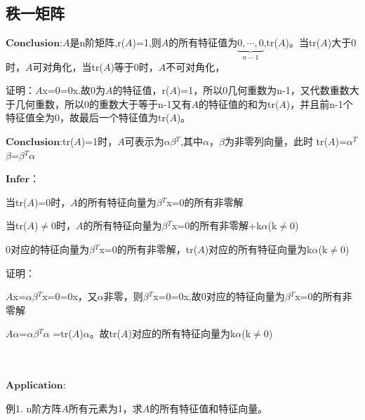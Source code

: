 \documentclass[lang=cn,10pt]{elegantbook}
\begin{document}
\subsection{秩一矩阵}

  $\mathbf{Conclusion}$:$\mathit{A}$是n阶矩阵,r($\mathit{A}$)=1,则$\mathit{A}$的所有特征值为$\underset{n-1}{\underbrace{0,\cdots ,0} } $,tr($\mathit{A}$)。当tr($\mathit{A}$)大于0时，$\mathit{A}$可对角化，当tr($\mathit{A}$)等于0时，$\mathit{A}$不可对角化，
  
  证明：$\mathit{A}$x=0=0x.故0为$\mathit{A}$的特征值，r($\mathit{A}$)=1，所以0几何重数为n-1，又代数重数大于几何重数，所以0的重数大于等于n-1又有$\mathit{A}$的特征值的和为tr($\mathit{A}$)，并且前n-1个特征值全为0，故最后一个特征值为tr($\mathit{A}$)。
  
  $\mathbf{Conclusion}$:tr($\mathit{A}$)=1时，$\mathit{A}$可表示为$\alpha$$\beta$$^{T}$,其中$\alpha$，$\beta$为非零列向量，此时
  tr($\mathit{A}$)=$\alpha$$^{T}$$\beta$=$\beta$$^{T}$$\alpha$
  
  $\mathbf{Infer}$：
  
  当tr($\mathit{A}$)=0时，$\mathit{A}$的所有特征向量为$\beta$$^{T}$x=0的所有非零解
  
  当tr($\mathit{A}$)$\ne$0时，$\mathit{A}$的所有特征向量为$\beta$$^{T}$x=0的所有非零解+k$\alpha$(k$\ne$0)
  
  0对应的特征向量为$\beta$$^{T}$x=0的所有非零解，tr($\mathit{A}$)对应的所有特征向量为k$\alpha$(k$\ne$0)
  
  证明：
  
  $\mathit{A}$x=$\alpha$$\beta$$^{T}$x=0=0x，又$\alpha$非零，则$\beta$$^{T}$x=0=0x,故0对应的特征向量为$\beta$$^{T}$x=0的所有非零解
  
  $\mathit{A}$$\alpha$=$\alpha$$\beta$$^{T}$$\alpha$ =tr($\mathit{A}$)$\alpha$。故tr($\mathit{A}$)对应的所有特征向量为k$\alpha$(k$\ne$0)
  
  ~\\
  ~\\
  
  $\mathbf{Application}$:
  
  例1. n阶方阵$\mathit{A}$所有元素为1，求$\mathit{A}$的所有特征值和特征向量。
  
\end{document}

